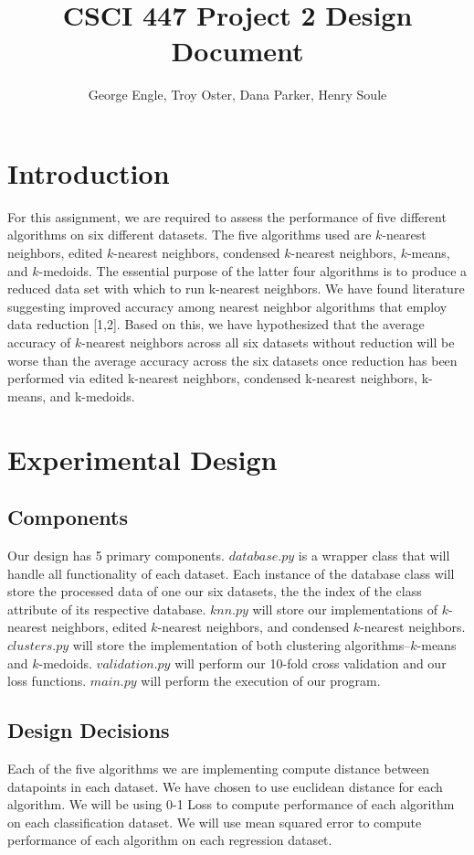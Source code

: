 \documentclass{article}
\title{CSCI 447 Project 2 Design Document}
\author{George Engle, Troy Oster, Dana Parker, Henry Soule}
\begin{document}
\maketitle
\section{Introduction}
For this assignment, we are required to assess the performance of five different algorithms on six different datasets. The five algorithms used are $k$-nearest neighbors, edited $k$-nearest neighbors, condensed $k$-nearest neighbors, $k$-means, and $k$-medoids.  The essential purpose of the latter four algorithms is to produce a reduced data set with which to run k-nearest neighbors. We have found literature suggesting improved accuracy among nearest neighbor algorithms that employ data reduction [1,2].  Based on this, we have hypothesized that the average accuracy of $k$-nearest neighbors across all six datasets without reduction will be worse than the average accuracy across the six datasets once reduction has been performed via edited k-nearest neighbors, condensed k-nearest neighbors, k-means, and k-medoids.
\section{Experimental Design}
\subsection*{Components}
Our design has 5 primary components. $database.py$ is a wrapper class that will handle all functionality of each dataset. Each instance of the database class will store the processed data of one our six datasets, the the index of the class attribute of its respective database. $knn.py$ will store our implementations of $k$-nearest neighbors, edited $k$-nearest neighbors, and condensed $k$-nearest neighbors. $clusters.py$ will store the implementation of both clustering algorithms--$k$-means and $k$-medoids. $validation.py$ will perform our 10-fold cross validation and our loss functions. $main.py$ will perform the execution of our program. 
\subsection*{Design Decisions}
Each of the five algorithms we are implementing compute distance between datapoints in each dataset. We have chosen to use euclidean distance for each algorithm. We will be using 0-1 Loss to compute performance of each algorithm on each classification dataset. We will use mean squared error to compute performance of each algorithm on each regression dataset. %
\end{document}
